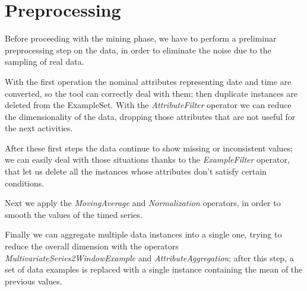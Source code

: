 \section{Preprocessing}

Before proceeding with the mining phase, we have to perform a preliminar preprocessing step on the data, in order to eliminate the noise due to the sampling of real data.
   
With the first operation the nominal attributes representing date and time are converted, so the tool can correctly deal with them; then duplicate instances are deleted from the ExampleSet. With the \textit{AttributeFilter} operator we can reduce the dimensionality of the data, dropping those attributes that are not useful for the next activities.

After these first steps the data continue to show missing or inconsistent values; we can easily deal with those situations thanks to the \textit{ExampleFilter} operator, that let us delete all the instances whose attributes don't satisfy certain conditions.     

Next we apply the \textit{MovingAverage} and \textit{Normalization} operators, in order to smooth the values of the timed series.

Finally we can aggregate multiple data instances into a single one, trying to reduce the overall dimension 
with the operators \textit{MultivariateSeries2WindowExample} and \textit{AttributeAggregation}; after this step, a set of data examples is replaced with a single instance containing the mean of the previous values. 